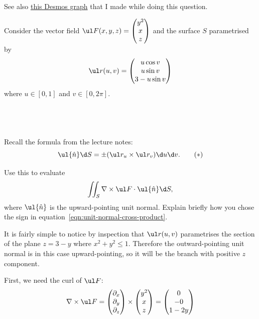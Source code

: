 \documentclass[a4paper]{article}
\begin{document}
See also \href{https://www.desmos.com/calculator/lt9gbsamu1}{this Desmos graph} that I made while doing this question.



\begin{questionbody}
Consider the vector field $\ul F(x, y, z) = \begin{pmatrix} y^2 \\ x \\ z \end{pmatrix}$ and the surface $S$ parametrised by \[
\ul r(u,v) = \begin{pmatrix} u \cos v \\ u \sin v \\ 3 - u \sin v \end{pmatrix}
\] where $u \in [0,1]$ and $v \in [0, 2\pi]$.
\end{questionbody}

\subsection{~} %

\begin{questionbody}
Recall the formula from the lecture notes: \begin{equation*}
\ul{\hat n} \d S = \pm (\ul r_u \times \ul r_v) \d u \d v .
\tag{$*$}
\label{eqn:unit-normal-cross-product}
\end{equation*}

Use this to evaluate \[
\iint_S \nabla \times \ul F \cdot \ul{\hat n} \d S ,
\] where $\ul{\hat n}$ is the upward-pointing unit normal. Explain briefly how you chose the sign in equation~\eqref{eqn:unit-normal-cross-product}.
\end{questionbody}

It is fairly simple to notice by inspection that $\ul r(u, v)$ parametrises the section of the plane $z = 3-y$ where $x^2 + y^2 \le 1$. Therefore the outward-pointing unit normal is in this case upward-pointing, so it will be the branch with positive $z$ component.

First, we need the curl of $\ul F$: \[
\nabla \times \ul F
= \begin{pmatrix} \partial_x \\ \partial_y \\ \partial_z \end{pmatrix}
\times \begin{pmatrix} y^2 \\ x \\ z \end{pmatrix}
= \begin{pmatrix} 0 \\ -0 \\ 1 - 2y \end{pmatrix}
\]
\end{document}
